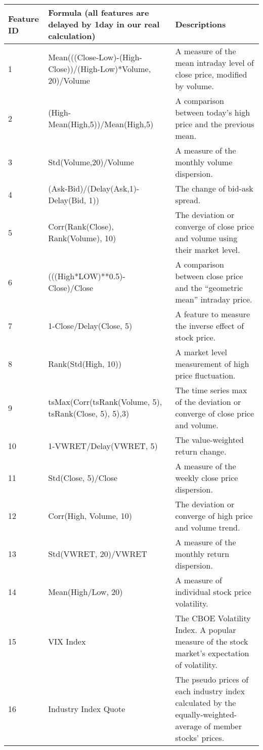\documentclass[fleqn,10pt]{SelfArx} %
\begin{document}
\begin{table*}[t]
  \centering
\caption{Feature Descriptions}
\begin{tabular}{p{}|p{}|p{}} 
      \hline
      Feature ID & Formula (all features are delayed by 1day in our real calculation) & Descriptions \\
      \hline
      1	& Mean(((Close-Low)-(High-Close))/(High-Low)*Volume, 20)/Volume & A measure of the mean intraday level of close price, modified by volume.\\
      \hline
      2 & (High-Mean(High,5))/Mean(High,5) & A comparison between today's high price and the previous mean.\\
      \hline
      3 & Std(Volume,20)/Volume & A measure of the monthly volume dispersion.\\
      \hline
      4 & (Ask-Bid)/(Delay(Ask,1)-Delay(Bid, 1)) & The change of bid-ask spread.\\
      \hline
      5 & Corr(Rank(Close), Rank(Volume), 10) & The deviation or converge of close price and volume using their market level.\\
      \hline
      6 & (((High*LOW)**0.5)-Close)/Close & A comparison between close price and the “geometric mean” intraday price. \\
      \hline
      7 & 1-Close/Delay(Close, 5) & A feature to measure the inverse effect of stock price.\\
      \hline
      8 & Rank(Std(High, 10)) & A market level measurement of high price fluctuation.\\
      \hline
      9 & tsMax(Corr(tsRank(Volume, 5), tsRank(Close, 5), 5),3) & The time series max of the deviation or converge of close price and volume.\\
      \hline
      10 & 1-VWRET/Delay(VWRET, 5) & The value-weighted return change.\\
      \hline
      11 & Std(Close, 5)/Close & A measure of the weekly close price dispersion.\\
      \hline
      12 & Corr(High, Volume, 10) & The deviation or converge of high price and volume trend.\\
      \hline
      13 & Std(VWRET, 20)/VWRET & A measure of the monthly return dispersion.\\
      \hline
      14 & Mean(High/Low, 20) & A measure of individual stock price volatility.\\
      \hline
      15 & VIX Index & The CBOE Volatility Index. A popular measure of the stock market's expectation of volatility.\\
      \hline
      16 & Industry Index Quote & The pseudo prices of each industry index calculated by the equally-weighted-average of member stocks' prices. \\
      \hline
  \end{tabular}
  \label{tab:2}
\end{table*}
\end{document}
